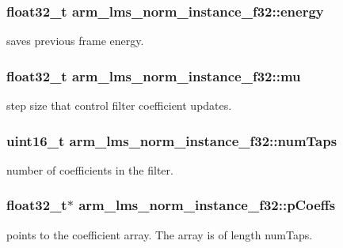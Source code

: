 \subsubsection[{\texorpdfstring{energy}{energy}}]{\setlength{\rightskip}{0pt plus 5cm}float32\+\_\+t arm\+\_\+lms\+\_\+norm\+\_\+instance\+\_\+f32\+::energy}\hypertarget{structarm__lms__norm__instance__f32_a6a4119e4f39447bbee31b066deafa16f}{}\label{structarm__lms__norm__instance__f32_a6a4119e4f39447bbee31b066deafa16f}
saves previous frame energy. 
\subsubsection[{\texorpdfstring{mu}{mu}}]{\setlength{\rightskip}{0pt plus 5cm}float32\+\_\+t arm\+\_\+lms\+\_\+norm\+\_\+instance\+\_\+f32\+::mu}\hypertarget{structarm__lms__norm__instance__f32_a84401d3cfc6c40f69c08223cf341b886}{}\label{structarm__lms__norm__instance__f32_a84401d3cfc6c40f69c08223cf341b886}
step size that control filter coefficient updates. 
\subsubsection[{\texorpdfstring{num\+Taps}{numTaps}}]{\setlength{\rightskip}{0pt plus 5cm}uint16\+\_\+t arm\+\_\+lms\+\_\+norm\+\_\+instance\+\_\+f32\+::num\+Taps}\hypertarget{structarm__lms__norm__instance__f32_ac95f8ca3d816524c2070643852fac5e8}{}\label{structarm__lms__norm__instance__f32_ac95f8ca3d816524c2070643852fac5e8}
number of coefficients in the filter. 
\subsubsection[{\texorpdfstring{p\+Coeffs}{pCoeffs}}]{\setlength{\rightskip}{0pt plus 5cm}float32\+\_\+t$\ast$ arm\+\_\+lms\+\_\+norm\+\_\+instance\+\_\+f32\+::p\+Coeffs}\hypertarget{structarm__lms__norm__instance__f32_a1ba688d90aba7de003ed4ad8e2e7ddda}{}\label{structarm__lms__norm__instance__f32_a1ba688d90aba7de003ed4ad8e2e7ddda}
points to the coefficient array. The array is of length num\+Taps. 
